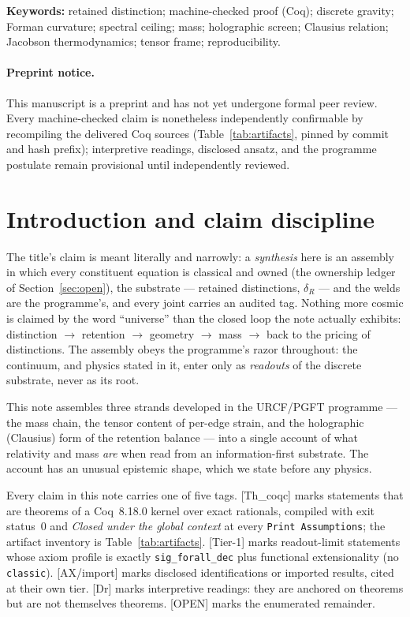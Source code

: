 \documentclass[10pt,twocolumn]{article}
\theoremstyle{definition}
\newcommand{\Thq}{\textsf{[Th\_coqc]}}
\newcommand{\Tone}{\textsf{[Tier-1]}}
\newcommand{\Dr}{\textsf{[Dr]}}
\newcommand{\Ax}{\textsf{[AX/import]}}
\newcommand{\Open}{\textsf{[OPEN]}}
\newcommand{\code}[1]{\texttt{#1}}
\begin{document}
\noindent\textbf{Keywords:} retained distinction; machine-checked proof (Coq);
discrete gravity; Forman curvature; spectral ceiling; mass; holographic screen;
Clausius relation; Jacobson thermodynamics; tensor frame; reproducibility.

\paragraph*{Preprint notice.} This manuscript is a preprint and has not yet
undergone formal peer review. Every machine-checked claim is nonetheless
independently confirmable by recompiling the delivered Coq sources
(Table~\ref{tab:artifacts}, pinned by commit and hash prefix); interpretive
readings, disclosed ansatz, and the programme postulate remain provisional until
independently reviewed.

\section{Introduction and claim discipline}\label{sec:intro}

The title's claim is meant literally and narrowly: a \emph{synthesis} here is an
assembly in which every constituent equation is classical and owned (the ownership
ledger of Section~\ref{sec:open}), the substrate --- retained distinctions,
$\delta_R$ --- and the welds are the programme's, and every joint carries an audited
tag. Nothing more cosmic is claimed by the word ``universe'' than the closed loop the
note actually exhibits: distinction $\to$ retention $\to$ geometry $\to$ mass
$\to$ back to the pricing of distinctions. The assembly obeys the programme's
razor throughout: the continuum, and physics stated in it, enter only as
\emph{readouts} of the discrete substrate, never as its root.

This note assembles three strands developed in the URCF/PGFT programme --- the mass
chain, the tensor content of per-edge strain, and the holographic (Clausius) form of
the retention balance --- into a single account of what relativity and mass \emph{are}
when read from an information-first substrate. The account has an unusual epistemic
shape, which we state before any physics.

Every claim in this note carries one of five tags. \Thq{} marks statements that are
theorems of a Coq~8.18.0 kernel over exact rationals, compiled with exit status~0 and
\emph{Closed under the global context} at every \code{Print Assumptions}; the artifact
inventory is Table~\ref{tab:artifacts}. \Tone{} marks readout-limit statements whose
axiom profile is exactly \code{sig\_forall\_dec} plus functional extensionality (no
\code{classic}). \Ax{} marks disclosed identifications or imported results, cited at
their own tier. \Dr{} marks interpretive readings: they are anchored on theorems but
are not themselves theorems. \Open{} marks the enumerated remainder.
\end{document}
